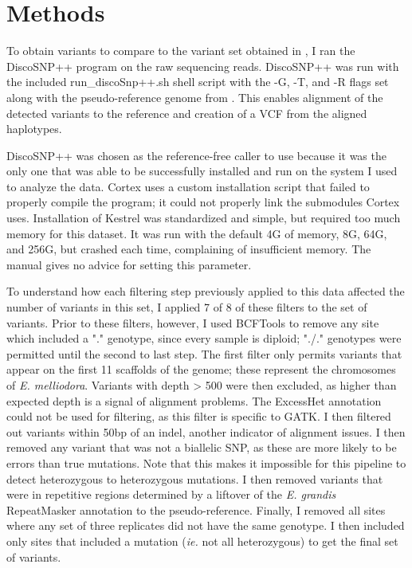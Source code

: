 \documentclass{article}
\begin{document}
\section{Methods}
\begin{outline}
	\item To obtain variants to compare to the variant set obtained in \cite{orr_phylogenomic_2020}, I ran the DiscoSNP++ program on the raw sequencing reads. DiscoSNP++ was run with the included run\_discoSnp++.sh shell script with the -G, -T, and -R flags set along with the pseudo-reference genome from \cite{orr_phylogenomic_2020}. This enables alignment of the detected variants to the reference and creation of a VCF from the aligned haplotypes.

	\item DiscoSNP++ was chosen as the reference-free caller to use because it was the only one that was able to be successfully installed and run on the system I used to analyze the data. Cortex uses a custom installation script that failed to properly compile the program; it could not properly link the submodules Cortex uses. Installation of Kestrel was standardized and simple, but required too much memory for this dataset. It was run with the default 4G of memory, 8G, 64G, and 256G, but crashed each time, complaining of insufficient memory. The manual gives no advice for setting this parameter.

	\item To understand how each filtering step previously applied to this data affected the number of variants in this set, I applied 7 of 8 of these filters to the set of variants. Prior to these filters, however, I used BCFTools to remove any site which included a "." genotype, since every sample is diploid; "./." genotypes were permitted until the second to last step. The first filter only permits variants that appear on the first 11 scaffolds of the genome; these represent the chromosomes of \textit{E. melliodora}. Variants with depth > 500 were then excluded, as higher than expected depth is a signal of alignment problems. The ExcessHet annotation could not be used for filtering, as this filter is specific to GATK. I then filtered out variants within 50bp of an indel, another indicator of alignment issues. I then removed any variant that was not a biallelic SNP, as these are more likely to be errors than true mutations. Note that this makes it impossible for this pipeline to detect heterozygous to heterozygous mutations. I then removed variants that were in repetitive regions determined by a liftover of the \textit{E. grandis} RepeatMasker annotation to the pseudo-reference. Finally, I removed all sites where any set of three replicates did not have the same genotype. I then included only sites that included a mutation (\textit{ie.} not all heterozygous) to get the final set of variants.


\end{outline}
\end{document}
